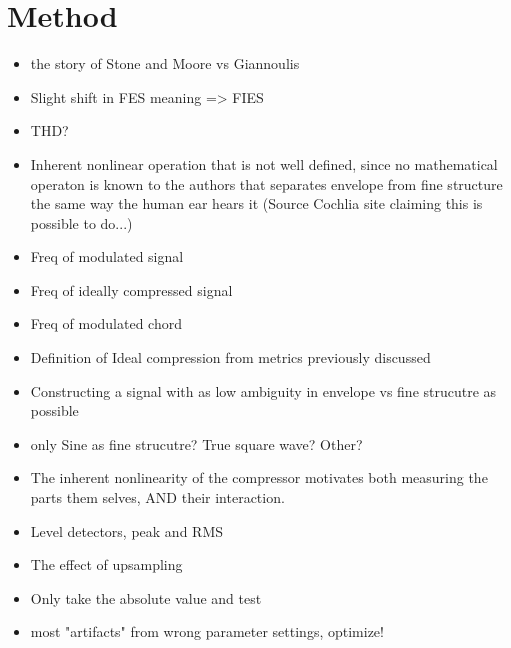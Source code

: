 \documentclass[../main2.tex]{subfiles}
\begin{document}
\section{Method}

\begin{itemize}
	\item the story of Stone and Moore vs Giannoulis
	\item Slight shift in FES meaning => FIES
	\item THD?
	\item Inherent nonlinear operation that is not well defined, since no mathematical operaton is known to the authors that separates envelope from fine structure the same way the human ear hears it (Source Cochlia site claiming this is possible to do...)
	\item Freq of modulated signal
	\item Freq of ideally compressed signal
	\item Freq of modulated chord

	\item Definition of Ideal compression from metrics previously discussed
	\item Constructing a signal with as low ambiguity in envelope vs fine strucutre as possible
	\item only Sine as fine strucutre? True square wave? Other?

	\item The inherent nonlinearity of the compressor motivates both measuring the parts them selves, AND their interaction.
	
	\item Level detectors, peak and RMS
	\item The effect of upsampling
	
	\item Only take the absolute value and test 

	\item most "artifacts" from wrong parameter settings, optimize!
\end{itemize}
\end{document}
